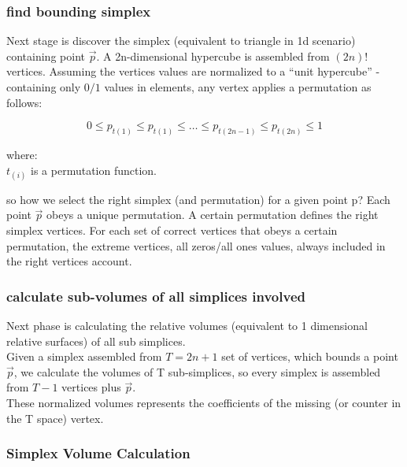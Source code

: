 		\subsubsection{find bounding simplex}
		
		Next stage is discover the simplex (equivalent to triangle in 1d scenario) containing point $\overrightarrow{p}$.
		A 2n-dimensional hypercube is assembled from $(2n)!$ vertices. 
		Assuming the vertices values are normalized to a “unit hypercube” - containing only $0/1$ values in elements, any vertex applies a permutation as follows:
		
		\begin{equation}
		0 \leq p_{t(1)} \leq p_{t(1)} \leq \dots \leq p_{t(2n-1)} \leq p_{t(2n)} \leq 1
		\end{equation}
		
		\cite{sippl1986cayley}
		
		where:\\
		$t_{(i)}$ is a permutation function.
		
		so how we select the right simplex (and permutation) for a given point p?
		Each point $\overrightarrow{p}$ obeys a unique permutation. 
		A certain permutation defines the right simplex vertices. 
		For each set of correct vertices that obeys a certain permutation, the extreme vertices, all zeros/all ones values, always included in the right vertices account. 
		
		
		
		\subsubsection{calculate sub-volumes of all simplices involved}
		
		Next phase is calculating the relative volumes (equivalent to 1 dimensional relative surfaces) of all sub simplices. 
		\\Given a simplex assembled from $T = 2n+1$ set of vertices, which bounds a point $\overrightarrow{p}$, we calculate the volumes of T sub-simplices, so every simplex is assembled from $T-1$ vertices plus $\overrightarrow{p}$. 
		\\These normalized volumes represents the coefficients of the missing (or counter in the T space) vertex.
		
		
		\subsubsection{Simplex Volume Calculation}
		
